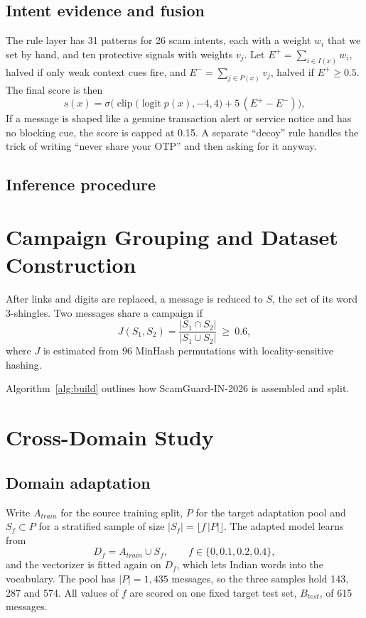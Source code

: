 \subsection{Intent evidence and fusion}
The rule layer has 31 patterns for 26 scam intents, each with a weight $w_i$ that we set by hand, and ten protective signals with weights $v_j$. Let $E^{+}=\sum_{i\in I(x)}w_i$, halved if only weak context cues fire, and $E^{-}=\sum_{j\in P(x)}v_j$, halved if $E^{+}\ge 0.5$. The final score is then
\begin{equation}
s(x)=\sigma\!\Big(\operatorname{clip}\big(\operatorname{logit}p(x),-4,4\big)+5\,(E^{+}-E^{-})\Big),
\end{equation}
If a message is shaped like a genuine transaction alert or service notice and has no blocking cue, the score is capped at 0.15. A separate ``decoy'' rule handles the trick of writing ``never share your OTP'' and then asking for it anyway.

\subsection{Inference procedure}


\section{Campaign Grouping and Dataset Construction}\label{sec:campaign}
After links and digits are replaced, a message is reduced to $S$, the set of its word 3-shingles. Two messages share a campaign if
\begin{equation}
J(S_1,S_2)=\frac{|S_1\cap S_2|}{|S_1\cup S_2|}\ \ge\ 0.6,
\end{equation}
where $J$ is estimated from 96 MinHash permutations with locality-sensitive hashing.

Algorithm~\ref{alg:build} outlines how ScamGuard-IN-2026 is assembled and split.



\section{Cross-Domain Study}\label{sec:xdomain}
\subsection{Domain adaptation}
Write $A_{train}$ for the source training split, $P$ for the target adaptation pool and $S_f\subset P$ for a stratified sample of size $|S_f|=\lfloor f\,|P|\rfloor$. The adapted model learns from
\begin{equation}
D_f=A_{train}\cup S_f,\qquad f\in\{0, 0.1, 0.2, 0.4\},
\end{equation}
and the vectorizer is fitted again on $D_f$, which lets Indian words into the vocabulary. The pool has $|P|=1{,}435$ messages, so the three samples hold 143, 287 and 574. All values of $f$ are scored on one fixed target test set, $B_{test}$, of 615 messages.

